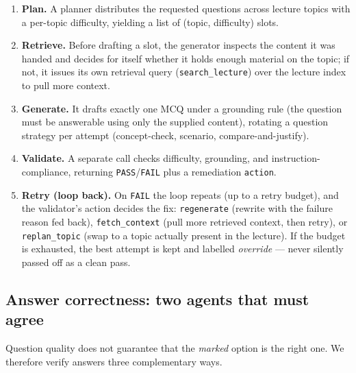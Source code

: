 \begin{enumerate}
  \item \textbf{Plan.} A planner distributes the requested questions across
        lecture topics with a per-topic difficulty, yielding a list of
        (topic, difficulty) slots.
  \item \textbf{Retrieve.} Before drafting a slot, the generator inspects the
        content it was handed and decides for itself whether it holds enough
        material on the topic; if not, it issues its own retrieval query
        (\texttt{search\_lecture}) over the lecture index to pull more context.
  \item \textbf{Generate.} It drafts exactly one MCQ under a grounding rule (the
        question must be answerable using only the supplied content), rotating a
        question strategy per attempt (concept-check, scenario, compare-and-justify).
  \item \textbf{Validate.} A separate call checks difficulty, grounding, and
        instruction-compliance, returning \texttt{PASS}/\texttt{FAIL} plus a
        remediation \texttt{action}.
  \item \textbf{Retry (loop back).} On \texttt{FAIL} the loop repeats (up to a
        retry budget), and the validator's action decides the fix:
        \texttt{regenerate} (rewrite with the failure reason fed back),
        \texttt{fetch\_context} (pull more retrieved context, then retry), or
        \texttt{replan\_topic} (swap to a topic actually present in the lecture).
        If the budget is exhausted, the best attempt is kept and labelled
        \emph{override} --- never silently passed off as a clean pass.
\end{enumerate}

\subsection{Answer correctness: two agents that must agree}
\label{sec:bulk-answer}

Question quality does not guarantee that the \emph{marked} option is the right
one. We therefore verify answers three complementary ways.

